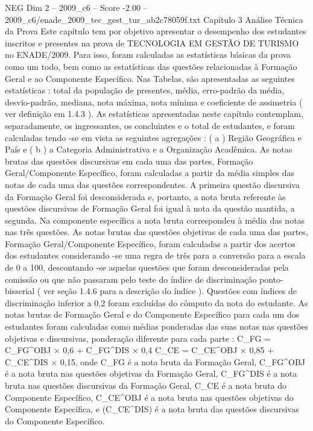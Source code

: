 \begin{textsample}{NEG Dim 2 – 2009\_c6 – Score -2.00 – 2009\_c6/enade\_2009\_tec\_gest\_tur\_ab2c78059f.txt}  \label{ex:f2_neg_134}
Capítulo 3 Análise Técnica da Prova Este capítulo tem por objetivo apresentar o desempenho dos estudantes inscritos e presentes na prova de TECNOLOGIA EM GESTÃO DE TURISMO no ENADE/2009.
Para isso, foram calculadas as estatísticas básicas da prova como um todo, bem como as estatísticas das questões relacionadas à Formação Geral e ao Componente Específico.
Nas Tabelas, são apresentadas as seguintes estatísticas : total da população de presentes, média, erro-padrão da média, desvio-padrão, mediana, nota máxima, nota mínima e coeficiente de assimetria ( ver definição em 1.4.3 ).
As estatísticas apresentadas neste capítulo contemplam, separadamente, os ingressantes, os concluintes e o total de estudantes, e foram calculadas tendo -se em vista as seguintes agregações : ( a ) Região Geográfica e País e ( b ) a Categoria Administrativa e a Organização Acadêmica.
As notas brutas das questões discursivas em cada uma das partes, Formação Geral/Componente Específico, foram calculadas a partir da média simples das notas de cada uma das questões correspondentes.
A primeira questão discursiva da Formação Geral foi desconsiderada e, portanto, a nota bruta referente às questões discursivas de Formação Geral foi igual à nota da questão mantida, a segunda.
Na componente específica a nota bruta correspondeu à média das notas nas três questões.
As notas brutas das questões objetivas de cada uma das partes, Formação Geral/Componente Específico, foram calculadas a partir dos acertos dos estudantes considerando -se uma regra de três para a conversão para a escala de 0 a 100, descontando -se aquelas questões que foram desconsideradas pela comissão ou que não passaram pelo teste do índice de discriminação ponto-bisserial ( ver seção 1.4.6 para a descrição do índice ).
Questões com índices de discriminação inferior a 0,2 foram excluídas do cômputo da nota do estudante.
As notas brutas de Formação Geral e do Componente Específico para cada um dos estudantes foram calculadas como médias ponderadas das suas notas nas questões objetivas e discursivas, ponderação diferente para cada parte : C\_FG = C\_FG\textasciicircum{}OBJ × 0,6 + C\_FG\textasciicircum{}DIS × 0,4 C\_CE = C\_CE\textasciicircum{}OBJ × 0,85 + C\_CE\textasciicircum{}DIS × 0,15, onde C\_FG é a nota bruta da Formação Geral, C\_FG\textasciicircum{}OBJ é a nota bruta nas questões objetivas da Formação Geral, C\_FG\textasciicircum{}DIS é a nota bruta nas questões discursivas da Formação Geral, C\_CE é a nota bruta do Componente Específico, C\_CE\textasciicircum{}OBJ é a nota bruta nas questões objetivas do Componente Específica, e (C\_CE\textasciicircum{}DIS) é a nota bruta das questões discursivas do Componente Específico.

\end{textsample}
